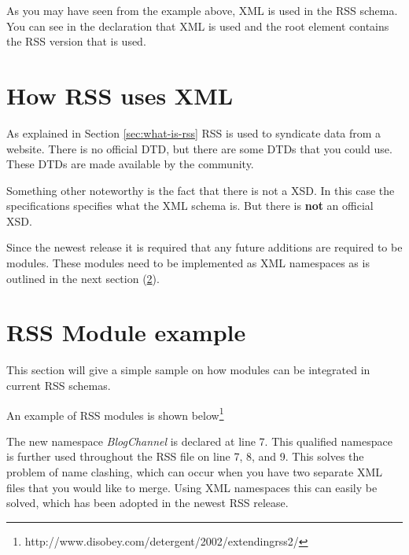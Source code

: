 As you may have seen from the example above, XML is used in the RSS schema. You can see in the declaration that XML is used and the root element contains the RSS version that is used.

\section{How RSS uses XML}
As explained in Section \ref{sec:what-is-rss} RSS is used to syndicate data from a website. There is no official DTD, but there are some DTDs that you could use. These DTDs are made available by the community.

Something other noteworthy is the fact that there is not a XSD. In this case the specifications specifies what the XML schema is. But there is \textbf{not} an official XSD.

Since the newest release it is required that any future additions are required to be modules. These modules need to be implemented as XML namespaces as is outlined in the next section (\ref{sec:rss-module-example}).

\section{RSS Module example}
\label{sec:rss-module-example}
This section will give a simple sample on how modules can be integrated in current RSS schemas.

\break
An example of RSS modules is shown below\footnote{http://www.disobey.com/detergent/2002/extendingrss2/}


The new namespace \textit{BlogChannel} is declared at line 7. This qualified namespace is further used throughout the RSS file on line 7, 8, and 9. This solves the problem of name clashing, which can occur when you have two separate XML files that you would like to merge. Using XML namespaces this can easily be solved, which has been adopted in the newest RSS release.